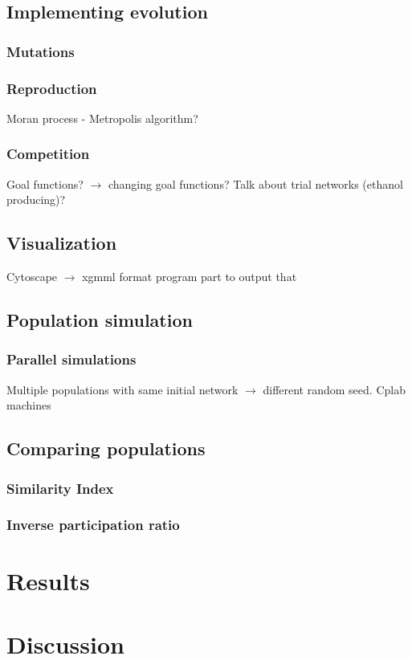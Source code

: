 \documentclass[]{article}
\begin{document}
\subsection{Implementing evolution}
\label{sub:Implementing evolution}
\subsubsection{Mutations}
\label{ssub:Mutations}
\subsubsection{Reproduction}
\label{ssub:Reproduction}
Moran process - Metropolis algorithm?

\subsubsection{Competition}
\label{ssub:Competition}
Goal functions? $\rightarrow$ changing goal functions? Talk about trial networks (ethanol producing)?

\subsection{Visualization}
\label{sub:visualization}

Cytoscape $\rightarrow$ xgmml format program part to output that

\subsection{Population simulation}
\label{sub:population_simulation}

\subsubsection{Parallel simulations}
\label{ssub:Paralell simulations}
Multiple populations with same initial network $\rightarrow$ different random seed. Cplab machines 


\subsection{Comparing populations}
\label{sub:comparing_populations}

\subsubsection{Similarity Index}
\label{ssub:Similarity Index}


\subsubsection{Inverse participation ratio}
\label{ssub:Inverse participation ratio}

\section{Results}
\label{sec:results}

\section{Discussion}
\label{sec:discussion}
\end{document}
